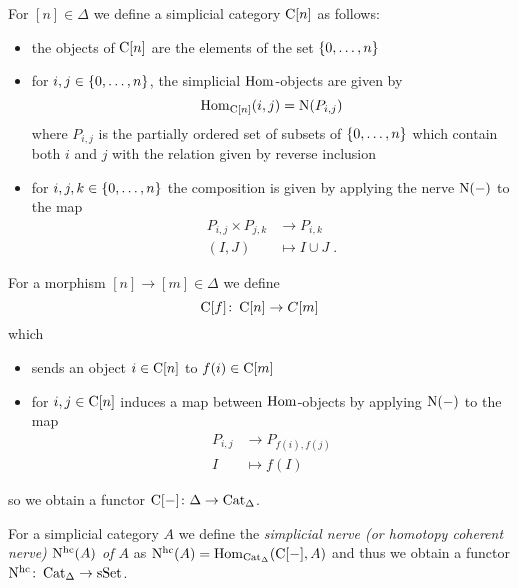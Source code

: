 \begin{construction}%
    For $[n]\in\Delta$ we define a simplicial category $\operatorname{C}[n]$ as follows:
    \begin{itemize}
        \item the objects of $\operatorname{C}[n]$ are the elements of the set $\left\lbrace0,\ldots,n\right\rbrace$
        \item for $i,j\in\left\lbrace0,\ldots,n\right\rbrace$, the simplicial $\operatorname{Hom}$-objects are given by 
            \begin{equation*}
                \operatorname{Hom}_{\operatorname{C}[n]}(i,j)=\operatorname{N}(P_{i,j})
            \end{equation*}
            where $P_{i,j}$ is the partially ordered set of subsets of $\left\lbrace0,\ldots,n\right\rbrace$ which contain both $i$ and $j$ with the relation given by reverse inclusion
        \item for $i,j,k\in\left\lbrace0,\ldots,n\right\rbrace$ the composition is given by applying the nerve $\operatorname{N}(-)$ to the map
        \begin{align*}
                P_{i,j}\times P_{j,k}&\to P_{i,k}\\
                (I,J)&\mapsto I\cup J\;.
        \end{align*}
    \end{itemize}
    For a morphism $[n]\to[m]\in\Delta$ we define
    \begin{equation*}
        \operatorname{C}[f]\colon\operatorname{C}[n]\to C[m]
    \end{equation*}
    which
    \begin{itemize}
        \item sends an object $i\in\operatorname{C}[n]$ to $f(i)\in\operatorname{C}[m]$
        \item for $i,j\in\operatorname{C}[n]$ induces a map between $\operatorname{Hom}$-objects by applying $\operatorname{N}(-)$ to the map
            \begin{align*}
                P_{i,j}&\to P_{f(i),f(j)}\\
                I&\mapsto f(I)
            \end{align*}
    \end{itemize}
    so we obtain a functor $\operatorname{C}[-]\colon\Delta\to\operatorname{Cat}_{\Delta}$.
\end{construction}
\begin{definition}
    For a simplicial category $A$ we define the \emph{simplicial nerve (or homotopy coherent nerve) $\operatorname{N^{hc}}(A)$ of $A$} as $\operatorname{N^{hc}}(A)=\operatorname{Hom}_{\operatorname{Cat}_{\Delta}}(\operatorname{C}[-],A)$ and thus we obtain a functor $\operatorname{N^{hc}}\colon\operatorname{Cat}_{\Delta}\to\operatorname{sSet}$.
\end{definition}
